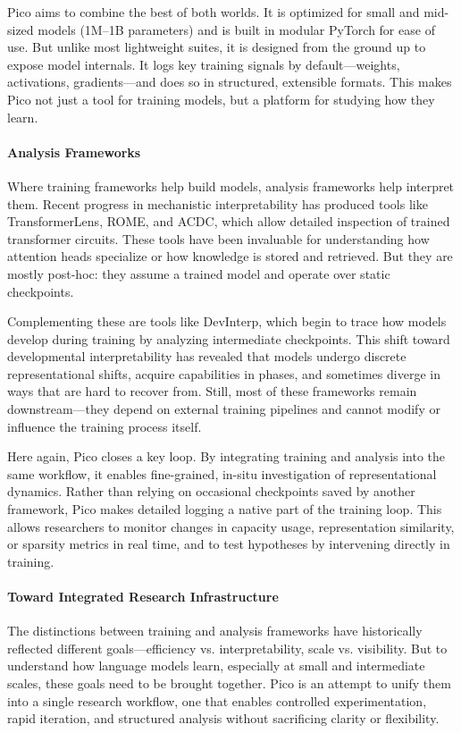 Pico aims to combine the best of both worlds. It is optimized for small and mid-sized models (1M--1B parameters) and is built in modular PyTorch for ease of use. But unlike most lightweight suites, it is designed from the ground up to expose model internals. It logs key training signals by default—weights, activations, gradients—and does so in structured, extensible formats. This makes Pico not just a tool for training models, but a platform for studying how they learn.

\paragraph{Analysis Frameworks} Where training frameworks help build models, analysis frameworks help interpret them. Recent progress in mechanistic interpretability has produced tools like TransformerLens, ROME, and ACDC, which allow detailed inspection of trained transformer circuits. These tools have been invaluable for understanding how attention heads specialize or how knowledge is stored and retrieved. But they are mostly post-hoc: they assume a trained model and operate over static checkpoints.

Complementing these are tools like DevInterp, which begin to trace how models develop during training by analyzing intermediate checkpoints. This shift toward developmental interpretability has revealed that models undergo discrete representational shifts, acquire capabilities in phases, and sometimes diverge in ways that are hard to recover from. Still, most of these frameworks remain downstream—they depend on external training pipelines and cannot modify or influence the training process itself.

Here again, Pico closes a key loop. By integrating training and analysis into the same workflow, it enables fine-grained, in-situ investigation of representational dynamics. Rather than relying on occasional checkpoints saved by another framework, Pico makes detailed logging a native part of the training loop. This allows researchers to monitor changes in capacity usage, representation similarity, or sparsity metrics in real time, and to test hypotheses by intervening directly in training.

\paragraph{Toward Integrated Research Infrastructure} The distinctions between training and analysis frameworks have historically reflected different goals—efficiency vs. interpretability, scale vs. visibility. But to understand how language models learn, especially at small and intermediate scales, these goals need to be brought together. Pico is an attempt to unify them into a single research workflow, one that enables controlled experimentation, rapid iteration, and structured analysis without sacrificing clarity or flexibility.

